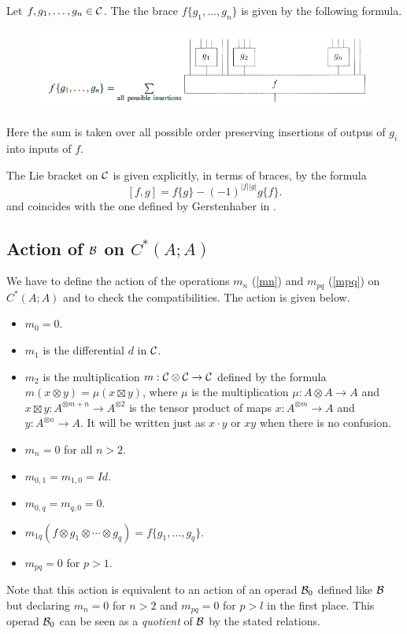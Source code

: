 \documentclass[TFM.tex]{subfiles}
\begin{document}
Let $f,g_1,\dots, g_n\in \mathcal{C}$. The the brace $f\{g_1,\dots, g_n\}$ is given by the following formula.\\

\begin{figure}[h!]
\includegraphics[scale=0.7]{Imagenes//brace}
\end{figure}

Here the sum is taken over all possible order preserving insertions of outpus of $g_i$ into
inputs of $f$.




The Lie bracket on $\mathcal{C}$ is given explicitly, in terms of braces, by the formula %
\[
[f,g]=f\{g\}-(-1)^{|f||g|}g\{f\}.
\]
and coincides with the one defined by Gerstenhaber in \cite{GH}.




\subsection{Action of $\mathcal{B}$ on $C^*(A;A)$}
We have to define the action of the operations
$m_n$ (\ref{mn}) and $m_{pq}$ (\ref{mpq}) on $C^*(A;A)$ and to check the compatibilities. The action is given below.
\begin{itemize}
\item $m_0=0$.
\item $m_1$ is the differential $d$ in $\mathcal{C}$. 
\item $m_2$ is the multiplication $m:\mathcal{C}\otimes\mathcal{C}\to\mathcal{C}$ defined by the formula $m(x\otimes y)=\mu(x\boxtimes y)$, where $\mu$ is the multiplication $\mu:A\otimes A\to A$ and $x\boxtimes y:A^{\otimes m+n}\to A^{\otimes 2}$ is the tensor product of maps $x:A^{\otimes m}\to A$ and $y:A^{\otimes n}\to A$. It will be written just as $x\cdot y$ or $xy$ when there is no confusion.
\item $m_n=0$ for all $n>2$. 
\item $m_{0,1}=m_{1,0}=Id$.
\item $m_{0,q}=m_{q,0}=0$.
\item $m_{1q}(f\otimes g_1\otimes\cdots\otimes g_q)=f\{g_1,\dots, g_q\}$.
\item $m_{pq}=0$ for $p>1$.
\end{itemize}
Note that this action is equivalent to an action of an operad $\mathcal{B}_0$ defined like $\mathcal{B}$ but declaring $m_n=0$ for $n>2$ and $m_{pq}=0$ for $p>l$ in the first place. This operad $\mathcal{B}_0$ can be seen as a \emph{quotient} of $\mathcal{B}$ by the stated relations. 
\end{document}
